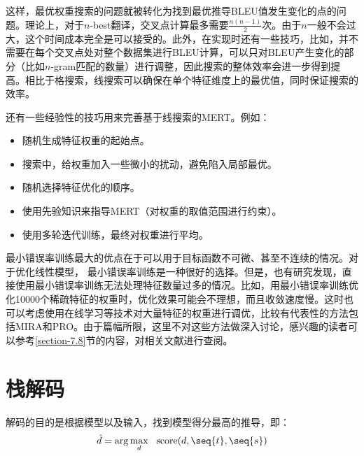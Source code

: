 \parinterval 这样，最优权重搜索的问题就被转化为找到最优推导BLEU值发生变化的点的问题。理论上，对于$n$-best翻译，交叉点计算最多需要$\frac{n(n-1)}{2}$次。由于$n$一般不会过大，这个时间成本完全是可以接受的。此外，在实现时还有一些技巧，比如，并不需要在每个交叉点处对整个数据集进行BLEU计算，可以只对BLEU产生变化的部分（比如$n$-gram匹配的数量）进行调整，因此搜索的整体效率会进一步得到提高。相比于格搜索，线搜索可以确保在单个特征维度上的最优值，同时保证搜索的效率。

\parinterval 还有一些经验性的技巧用来完善基于线搜索的MERT。例如：

\begin{itemize}
\vspace{0.5em}
\item 随机生成特征权重的起始点。
\vspace{0.5em}
\item 搜索中，给权重加入一些微小的扰动，避免陷入局部最优。
\vspace{0.5em}
\item 随机选择特征优化的顺序。
\vspace{0.5em}
\item 使用先验知识来指导MERT（对权重的取值范围进行约束）。
\vspace{0.5em}
\item 使用多轮迭代训练，最终对权重进行平均。
\vspace{0.5em}
\end{itemize}

\parinterval 最小错误率训练最大的优点在于可以用于目标函数不可微、甚至不连续的情况。对于优化线性模型， 最小错误率训练是一种很好的选择。但是，也有研究发现，直接使用最小错误率训练无法处理特征数量过多的情况。比如，用最小错误率训练优化10000个稀疏特征的权重时，优化效果可能会不理想，而且收敛速度慢。这时也可以考虑使用在线学习等技术对大量特征的权重进行调优，比较有代表性的方法包括MIRA和PRO。由于篇幅所限，这里不对这些方法做深入讨论，感兴趣的读者可以参考\ref{section-7.8}节的内容，对相关文献进行查阅。


\sectionnewpage
\section{栈解码}

\parinterval 解码的目的是根据模型以及输入，找到模型得分最高的推导，即：
\begin{eqnarray}
\hat{d} = \arg\max_{d}\ \ \textrm{score}(d,\seq{t},\seq{s})
\label{eq:7-21}
\end{eqnarray}

